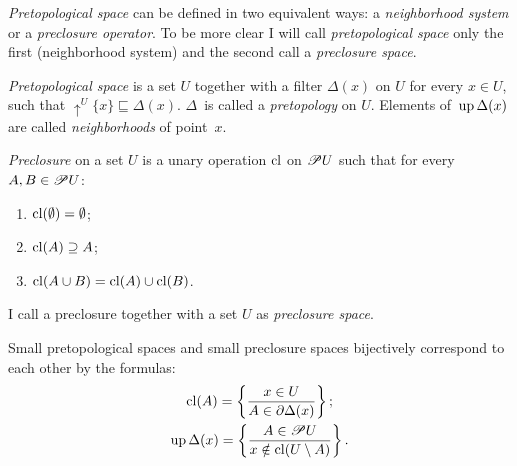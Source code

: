 \emph{Pretopological space} can be defined in two equivalent ways:
a \emph{neighborhood system} or a \emph{preclosure operator}. To be
more clear I will call \emph{pretopological space} only the first
(neighborhood system) and the second call a \emph{preclosure space}.
\begin{defn}
\emph{Pretopological
space} is a set $U$ together with a filter $\Delta(x)$ on \emph{$U$}
for every $x\in U$, such that $\uparrow^{U}\{x\}\sqsubseteq\Delta(x)$.
$\Delta$~is called a \emph{pretopology} on $U$.
Elements of~$\operatorname{up}\Delta(x)$ are called \emph{neighborhoods} of point~$x$.
\end{defn}

\begin{defn}
\emph{Preclosure} on a set $U$ is a unary operation
$\operatorname{cl}$ on $\mathscr{P} U$ such that for every $A,B\in\mathscr{P} U$:
\begin{enumerate}
\item $\operatorname{cl}(\emptyset)=\emptyset$;
\item $\operatorname{cl}(A)\supseteq A$;
\item $\operatorname{cl}(A\cup B)=\operatorname{cl}(A)\cup\operatorname{cl}(B)$.
\end{enumerate}

I call a preclosure together with a set $U$
as \emph{preclosure space}.

\end{defn}
\begin{thm}
\label{pretop-bij}Small pretopological spaces and small preclosure
spaces bijectively correspond to each other by the formulas:
\begin{gather}
\operatorname{cl}(A)=\left\{ \frac{x\in U}{A\in\partial\Delta(x)}\right\};\label{pt-cl}\\
\operatorname{up}\Delta(x)=\left\{ \frac{A\in\mathscr{P} U}{x\notin\operatorname{cl}(U\setminus A)}\right\}.\label{pt-neigh}
\end{gather}
\end{thm}
